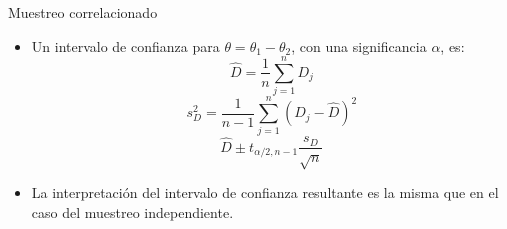 \begin{frame}{Muestreo correlacionado}
    \begin{itemize}
        \item Un intervalo de confianza para $\theta=\theta_1-\theta_2$, con una significancia $\alpha$, es:
        \[\hat{ D }=\frac{1}{n}\sum_{j=1}^{n}{D_j}\]
        \[s_D^2=\frac{1}{n-1} \sum_{j=1}^{n}{\left(D_j-\hat{ D} \right)^2}\]
        \[\hat{ D }\pm t_{\alpha/2,n-1}\frac{s_D}{\sqrt{n}}\]
        \item La interpretación del intervalo de confianza resultante es la misma que en el caso del muestreo independiente.
    \end{itemize}
\end{frame}